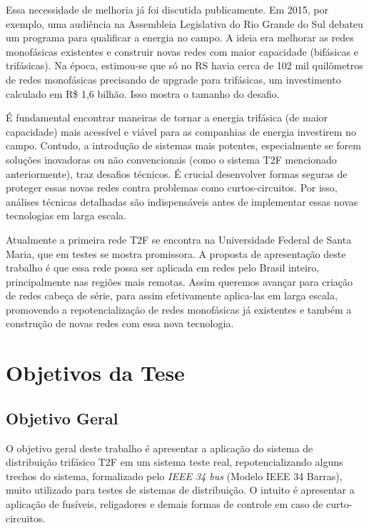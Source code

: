 \documentclass[oneside,openright,12pt]{ufsm_2021} %
\begin{document}
\par Essa necessidade de melhoria já foi discutida publicamente. Em 2015, por exemplo, uma audiência na Assembleia Legislativa do Rio Grande do Sul debateu um programa para qualificar a energia no campo. A ideia era melhorar as redes monofásicas existentes e construir novas redes com maior capacidade (bifásicas e trifásicas). Na época, estimou-se que só no RS havia cerca de 102 mil quilômetros de redes monofásicas precisando de upgrade para trifásicas, um investimento calculado em R\$ 1,6 bilhão. Isso mostra o tamanho do desafio.

\par É fundamental encontrar maneiras de tornar a energia trifásica (de maior capacidade) mais acessível e viável para as companhias de energia investirem no campo. Contudo, a introdução de sistemas mais potentes, especialmente se forem soluções inovadoras ou não convencionais (como o sistema T2F mencionado anteriormente), traz desafios técnicos. É crucial desenvolver formas seguras de proteger essas novas redes contra problemas como curtos-circuitos. Por isso, análises técnicas detalhadas são indispensáveis antes de implementar essas novas tecnologias em larga escala.

\par Atualmente a primeira rede T2F se encontra na Universidade Federal de Santa Maria, que em testes se mostra promissora. A proposta de apresentação deste trabalho é que essa rede possa ser aplicada em redes pelo Brasil inteiro, principalmente nas regiões mais remotas. Assim queremos avançar para criação de redes cabeça de série, para assim efetivamente aplica-las em larga escala, promovendo a repotencialização de redes monofásicas já existentes e também a construção de novas redes com essa nova tecnologia.

\section{Objetivos da Tese}
\subsection{Objetivo Geral}
\par O objetivo geral deste trabalho é apresentar a aplicação do sistema de distribuição trifásico T2F em um sistema teste real, repotencializando alguns trechos do sistema, formalizado pelo \textit{IEEE 34 bus} (Modelo IEEE 34 Barras), muito utilizado para testes de sistemas de distribuição. O intuito é apresentar a aplicação de fusíveis, religadores e demais formas de controle em caso de curto-circuitos.
\end{document}
